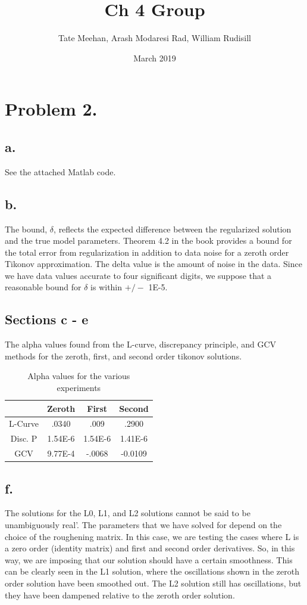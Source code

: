 \documentclass{article}
\title{Ch 4 Group}
\author{Tate Meehan, Arash Modaresi Rad, William Rudisill}
\date{March 2019}
\begin{document}
\maketitle

\section*{Problem 2.}
\subsection*{a.}
See the attached Matlab code. 

\subsection*{b.}
The bound, $\delta$, reflects the expected difference between the regularized  solution and the true model parameters. Theorem 4.2 in the book provides a bound for the total error from regularization in addition to data noise for a zeroth order Tikonov approximation. The delta value is the amount of noise in the data. Since we have data values accurate to four significant digits, we suppose that a reasonable bound for $\delta$ is within $+/-$ 1E-5. 

\subsection*{Sections c - e}
The alpha values found from the L-curve, discrepancy principle, and GCV methods for the zeroth, first, and second order tikonov solutions.

\begin{table}[ht!]
    \centering
    \begin{tabular}{|c|c|c|c|}
         \hline 
                 & Zeroth & First & Second    \\
         \hline
         L-Curve &  .0340  &  .009 &  .2900   \\ 
         \hline
         Disc. P & 1.54E-6 & 1.54E-6 & 1.41E-6 \\ \hline
         GCV     & 9.77E-4 & -.0068 & -0.0109 \\
         \hline
    \end{tabular}
    \caption{Alpha values for the various experiments}
    \label{tab:my_label}
\end{table}
\vspace{-20pt}
\subsection*{f.}
The solutions for the L0, L1, and L2 solutions cannot be said to be unambiguously real'. The parameters that we have solved for depend on the choice of the roughening matrix. In this case, we are testing the cases where L is a zero order (identity matrix) and first and second order derivatives. So, in this way, we are imposing that our solution should have a certain smoothness. This can be clearly seen in the L1 solution, where the oscillations shown in the zeroth order solution have been smoothed out. The L2 solution still has oscillations, but they have been dampened relative to the zeroth order solution. 
\end{document}
